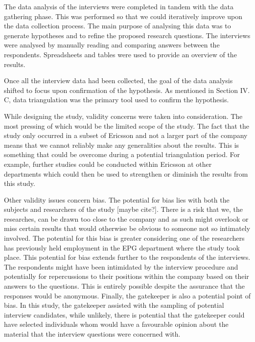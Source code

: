 \documentclass[10pt,twocolumn]{article}
\begin{document}
The data analysis of the interviews were completed in tandem with the data gathering phase. This was performed so that we could iteratively improve upon the data collection process. The main purpose of analysing this data was to generate hypotheses and to refine the proposed research questions. The interviews were analysed by manually reading and comparing answers between the respondents. Spreadsheets and tables were used to provide an overview of the results.

Once all the interview data had been collected, the goal of the data analysis shifted to focus upon confirmation of the hypothesis. As mentioned in Section IV. C, data triangulation was the primary tool used to confirm the hypothesis. 


While designing the study, validity concerns were taken into consideration. The most pressing of which would be the limited scope of the study. The fact that the study only occurred in a subset of Ericsson and not a larger part of the company means that we cannot reliably make any generalities about the results. This is something that could be overcome during a potential triangulation period. For example, further studies could be conducted within Ericsson at other departments which could then be used to strengthen or diminish the results from this study.

Other validity issues concern bias. The potential for bias lies with both the subjects and researchers of the study [maybe cite?]. There is a risk that we, the researches, can be drawn too close to the company and as such might overlook or miss certain results that would otherwise be obvious to someone not so intimately involved. The potential for this bias is greater considering one of the researchers has previously held employment in the EPG department where the study took place. This potential for bias extends further to the respondents of the interviews. The respondents might have been intimidated by the interview procedure and potentially for repercussions to their positions within the company based on their answers to the questions. This is entirely possible despite the assurance that the responses would be anonymous. Finally, the gatekeeper is also a potential point of bias. In this study, the gatekeeper assisted with the sampling of potential interview candidates, while unlikely, there is potential that the gatekeeper could have selected individuals whom would have a favourable opinion about the material that the interview questions were concerned with.
\end{document}
